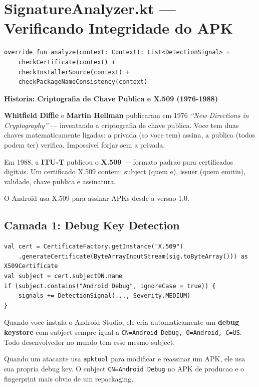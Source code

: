 \documentclass[12pt,a4paper]{article}
\begin{document}
\newpage

\section{SignatureAnalyzer.kt --- Verificando Integridade do APK}

\begin{lstlisting}
override fun analyze(context: Context): List<DetectionSignal> =
    checkCertificate(context) +
    checkInstallerSource(context) +
    checkPackageNameConsistency(context)
\end{lstlisting}

\begin{historybox}
\textbf{Historia: Criptografia de Chave Publica e X.509 (1976-1988)}

\textbf{Whitfield Diffie} e \textbf{Martin Hellman} publicaram em 1976
\textit{``New Directions in Cryptography''} --- inventando a criptografia de
chave publica. Voce tem duas chaves matematicamente ligadas: a privada (so voce
tem) assina, a publica (todos podem ter) verifica. Impossivel forjar sem a privada.

Em 1988, a \textbf{ITU-T} publicou o \textbf{X.509} --- formato padrao para
certificados digitais. Um certificado X.509 contem: subject (quem e), issuer
(quem emitiu), validade, chave publica e assinatura.

O Android usa X.509 para assinar APKs desde a versao 1.0.
\end{historybox}

\subsection{Camada 1: Debug Key Detection}

\begin{lstlisting}
val cert = CertificateFactory.getInstance("X.509")
    .generateCertificate(ByteArrayInputStream(sig.toByteArray())) as X509Certificate
val subject = cert.subjectDN.name
if (subject.contains("Android Debug", ignoreCase = true)) {
    signals += DetectionSignal(..., Severity.MEDIUM)
}
\end{lstlisting}

Quando voce instala o Android Studio, ele cria automaticamente um
\textbf{debug keystore} com subject sempre igual a \texttt{CN=Android Debug, O=Android, C=US}.
Todo desenvolvedor no mundo tem esse mesmo subject.

Quando um atacante usa \texttt{apktool} para modificar e reassinar um APK,
ele usa sua propria debug key. O subject \texttt{CN=Android Debug} no APK
de producao e o fingerprint mais obvio de um repackaging.
\end{document}
